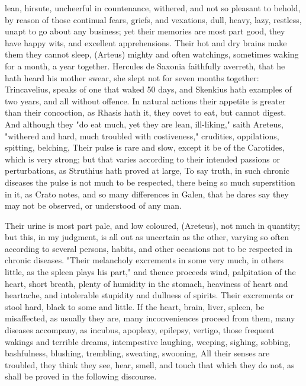 {lean, hirsute, uncheerful in countenance, withered, and not so pleasant to
behold, by reason of those continual fears, griefs, and vexations, dull, heavy,
lazy, restless, unapt to go about any business; yet their memories are most
part good, they have happy wits, and excellent apprehensions. Their hot and dry
brains make them they cannot sleep, 
(Arteus) mighty and often watchings, sometimes waking for a month, a year
together. Hercules de Saxonia faithfully averreth, that he
hath heard his mother swear, she slept not for seven months together:
Trincavelius,  speaks of one that waked
50 days, and Skenkius hath examples of two years, and all without offence. In
natural actions their appetite is greater than their concoction,  as Rhasis hath it, they covet to eat, but cannot
digest. And although they "do eat much, yet they are lean,
ill-liking," saith Areteus, "withered and hard, much troubled with
costiveness," crudities, oppilations, spitting, belching, \etc{} Their pulse is
rare and slow, except it be of the Carotides, which is
very strong; but that varies according to their intended passions or
perturbations, as Struthius hath proved at large,
 To say truth, in such
chronic diseases the pulse is not much to be respected, there being so much
superstition in it, as Crato notes, and so many
differences in Galen, that he dares say they may not be observed, or understood
of any man.

Their urine is most part pale, and low coloured,  (Areteus), not much in quantity; but this, in my judgment, is all out
as uncertain as the other, varying so often according to several persons,
habits, and other occasions not to be respected in chronic diseases.
"Their melancholy excrements in some very much, in others
little, as the spleen plays his part," and thence proceeds wind, palpitation of
the heart, short breath, plenty of humidity in the stomach, heaviness of heart
and heartache, and intolerable stupidity and dullness of spirits. Their
excrements or stool hard, black to some and little. If the heart, brain, liver,
spleen, be misaffected, as usually they are, many inconveniences proceed from
them, many diseases accompany, as incubus, apoplexy,
epilepsy, vertigo, those frequent wakings and terrible dreams,
intempestive laughing, weeping, sighing, sobbing,
bashfulness, blushing, trembling, sweating, swooning, \etc{}
All their senses are troubled, they think they see, hear,
smell, and touch that which they do not, as shall be proved in the following
discourse.

}
